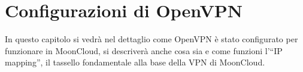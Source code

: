 \chapter{Configurazioni di OpenVPN}

In questo capitolo si vedrà nel dettaglio come OpenVPN è stato configurato
per funzionare in MoonCloud, si descriverà anche cosa sia e come funzioni l'``IP mapping'',
il tassello fondamentale alla base della VPN di MoonCloud.








